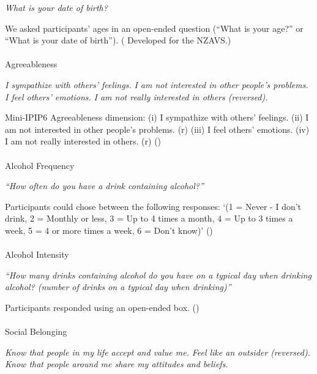 \documentclass[
  single column]{article}
\makeatletter
\let\oldparagraph\paragraph
\renewcommand{\paragraph}{
    \@ifstar
      \xxxParagraphStar
      \xxxParagraphNoStar
  }
\newcommand{\xxxParagraphStar}[1]{\oldparagraph*{#1}\mbox{}}
\newcommand{\xxxParagraphNoStar}[1]{\oldparagraph{#1}\mbox{}}
\makeatother
\begin{document}
\emph{What is your date of birth?}

We asked participants' ages in an open-ended question (``What is your
age?'' or ``What is your date of birth'').
( Developed for the
NZAVS.)

\paragraph{Agreeableness}\label{agreeableness}

\emph{I sympathize with others' feelings.} \emph{I am not interested in
other people's problems.} \emph{I feel others' emotions.} \emph{I am not
really interested in others (reversed).}

Mini-IPIP6 Agreeableness dimension: (i) I sympathize with others'
feelings. (ii) I am not interested in other people's problems. (r) (iii)
I feel others' emotions. (iv) I am not really interested in others. (r)
()

\paragraph{Alcohol Frequency}\label{alcohol-frequency}

\emph{``How often do you have a drink containing alcohol?''}

Participants could chose between the following responses: `(1 = Never -
I don't drink, 2 = Monthly or less, 3 = Up to 4 times a month, 4 = Up to
3 times a week, 5 = 4 or more times a week, 6 = Don't know)'
()

\paragraph{Alcohol Intensity}\label{alcohol-intensity}

\emph{``How many drinks containing alcohol do you have on a typical day
when drinking alcohol? (number of drinks on a typical day when
drinking)''}

Participants responded using an open-ended box.
()

\paragraph{Social Belonging}\label{social-belonging}

\emph{Know that people in my life accept and value me.} \emph{Feel like
an outsider (reversed).} \emph{Know that people around me share my
attitudes and beliefs.}
\end{document}
